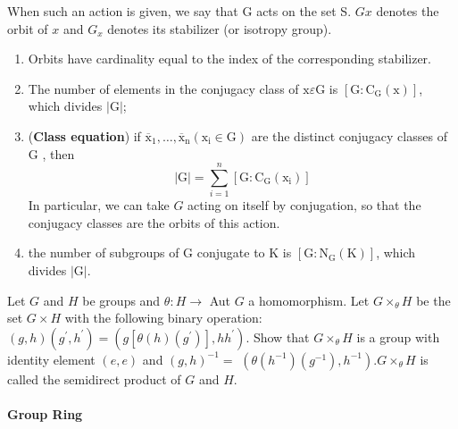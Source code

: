 When such an action is given, we say that G acts on the set S. $Gx$ denotes the orbit of $x$ and $G_x$ denotes its stabilizer (or isotropy group).



\begin{theo}
    \begin{enumerate}
        \item Orbits have cardinality equal to the index of the corresponding stabilizer.
        \item The number of elements in the conjugacy class of $\mathrm{x} \varepsilon \mathrm{G}$ is $\left[\mathrm{G}: \mathrm{C}_{\mathrm{G}}(\mathrm{x})\right]$, which divides $|\mathrm{G}|$;
        \item (\textbf{Class equation}) if $\overline{\mathrm{x}}_1, \ldots, \overline{\mathrm{x}}_{\mathrm{n}}\left(\mathrm{x}_{\mathrm{i}} \in \mathrm{G}\right)$ are the distinct conjugacy classes of G , then $$
|\mathrm{G}|=\sum_{i=1}^n\left[\mathrm{G}: \mathrm{C}_{\mathrm{G}}\left(\mathrm{x}_{\mathrm{i}}\right)\right]
$$ In particular, we can take $G$ acting on itself by conjugation, so that the conjugacy classes are the orbits of this action.
\item the number of subgroups of G conjugate to K is $\left[\mathrm{G}: \mathrm{N}_{\mathrm{G}}(\mathrm{K})\right]$, which divides $|\mathrm{G}|$.
\end{enumerate}
\end{theo}

Let $G$ and $H$ be groups and $\theta: H \rightarrow$ Aut $G$ a homomorphism. Let $G \times_\theta H$ be the set $G \times H$ with the following binary operation: $(g, h)\left(g^{\prime}, h^{\prime}\right)=\left(g\left[\theta(h)\left(g^{\prime}\right)\right], h h^{\prime}\right)$. Show that $G \times_\theta H$ is a group with identity element $(e, e)$ and $(g, h)^{-1}=$ $\left(\theta\left(h^{-1}\right)\left(g^{-1}\right), h^{-1}\right) . G \times_\theta H$ is called the semidirect product of $G$ and $H$.
















\paragraph*{Group Ring}


